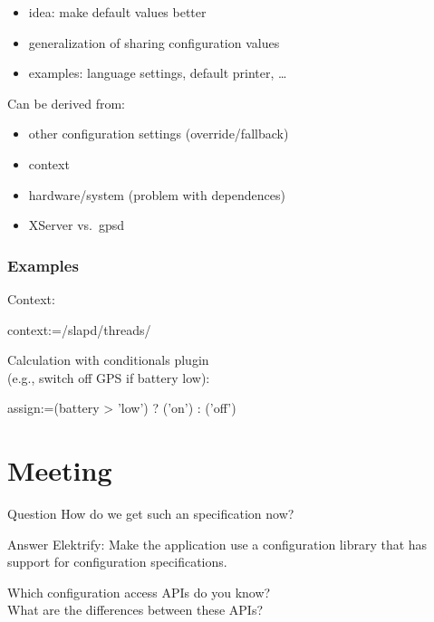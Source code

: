 \begin{frame}
	\begin{itemize}
	\item idea: make default values better
	\item generalization of sharing configuration values
	\item examples: language settings, default printer, \dots
	\end{itemize}
	\pause
	\vspace{1cm}
	Can be derived from:
	\begin{itemize}
	\item other configuration settings (override/fallback)
	\item context~\cite{raab2017introducing}
	\item hardware/system (problem with dependences)
	\pause
	\vspace{1cm}
	\item XServer vs.\ gpsd
	\end{itemize}
\end{frame}

\begin{frame}[fragile]
	\frametitle{Examples}
	Context:
	\begin{code}
	context:=/slapd/threads/%
	\end{code}

	\pause
	\vspace{1cm}
	Calculation with conditionals plugin
	\\ (e.g., switch off GPS if battery low):
	\begin{code}
	assign:=(battery > 'low') ? ('on') : ('off')
	\end{code}
\end{frame}

\section{Meeting}

\begin{frame}
	\begin{alertblock}{Question}
	How do we get such an specification now?
	\end{alertblock}

	\pause
	\begin{exampleblock}{Answer}
	Elektrify: Make the application use a configuration library that has support for configuration specifications.
	\end{exampleblock}
\end{frame}

\begin{frame}
	\begin{task}
	Which configuration access APIs do you know? \\
	What are the differences between these APIs?
	\end{task}
\end{frame}

\appendix

\begin{frame}[allowframebreaks]
	
	
\end{frame}



